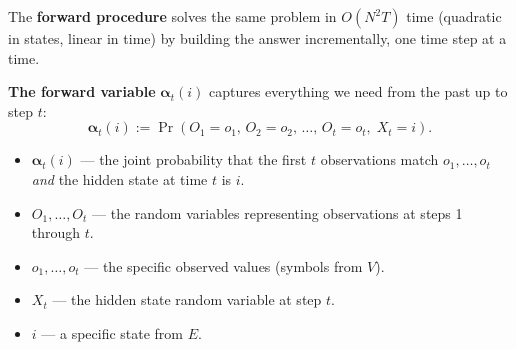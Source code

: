\documentclass[12pt, a4paper]{article}
\begin{document}
The \textbf{forward procedure} solves the same problem in $O(N^2 T)$ time
(quadratic in states, linear in time) by building the answer incrementally,
one time step at a time.

\vspace{4pt}
\textbf{The forward variable} $\boldsymbol{\alpha}_t(i)$ captures everything
we need from the past up to step $t$:
\[
  \boldsymbol{\alpha}_t(i) := \Pr(O_1=o_1,\, O_2=o_2,\, \ldots,\, O_t=o_t,\; X_t=i).
\]
\begin{itemize}[leftmargin=1.4em, itemsep=2pt]
  \item $\boldsymbol{\alpha}_t(i)$ --- the joint probability that the first $t$
    observations match $o_1,\ldots,o_t$ \emph{and} the hidden state at time
    $t$ is $i$.
  \item $O_1, \ldots, O_t$ --- the random variables representing observations
    at steps 1 through $t$.
  \item $o_1, \ldots, o_t$ --- the specific observed values (symbols from $V$).
  \item $X_t$ --- the hidden state random variable at step $t$.
  \item $i$ --- a specific state from $E$.
\end{itemize}
\end{document}
